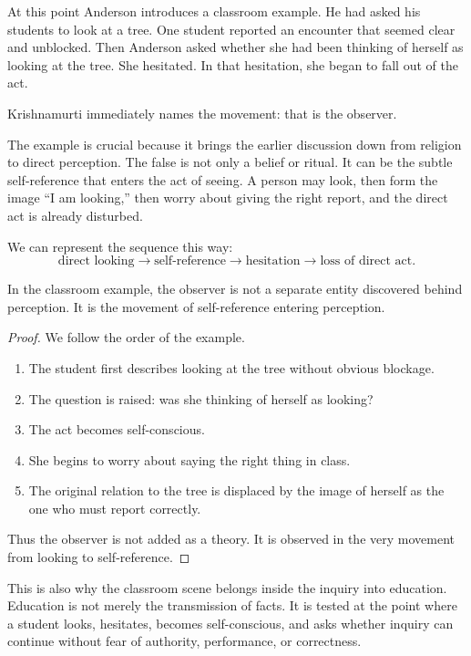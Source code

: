 At this point Anderson introduces a classroom example. He had asked his students to look at a tree. One student reported an encounter that seemed clear and unblocked. Then Anderson asked whether she had been thinking of herself as looking at the tree. She hesitated. In that hesitation, she began to fall out of the act.

Krishnamurti immediately names the movement: that is the observer.

The example is crucial because it brings the earlier discussion down from religion to direct perception. The false is not only a belief or ritual. It can be the subtle self-reference that enters the act of seeing. A person may look, then form the image ``I am looking,'' then worry about giving the right report, and the direct act is already disturbed.

We can represent the sequence this way:
\begin{equation}
\text{direct looking}
\longrightarrow
\text{self-reference}
\longrightarrow
\text{hesitation}
\longrightarrow
\text{loss of direct act}.
\end{equation}

\begin{proposition}
In the classroom example, the observer is not a separate entity discovered behind perception. It is the movement of self-reference entering perception.
\end{proposition}

\begin{proof}
We follow the order of the example.
\begin{enumerate}
\item The student first describes looking at the tree without obvious blockage.
\item The question is raised: was she thinking of herself as looking?
\item The act becomes self-conscious.
\item She begins to worry about saying the right thing in class.
\item The original relation to the tree is displaced by the image of herself as the one who must report correctly.
\end{enumerate}
Thus the observer is not added as a theory. It is observed in the very movement from looking to self-reference.
\end{proof}

This is also why the classroom scene belongs inside the inquiry into education. Education is not merely the transmission of facts. It is tested at the point where a student looks, hesitates, becomes self-conscious, and asks whether inquiry can continue without fear of authority, performance, or correctness.

